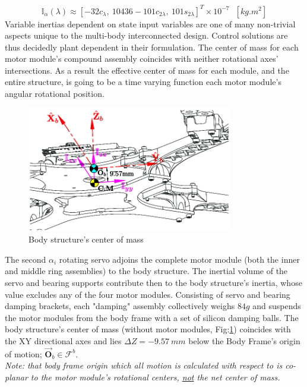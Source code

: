 \begin{equation}\label{eq:inertia.middle.vpa}
\mathbb{I}_\alpha(\lambda)\approx[-32{c}_{\lambda},~ 10436-101{c}_{2\lambda},~ 101{s}_{2\lambda}]^T\times10^{-7}~~~[kg.m^2]
\end{equation}
Variable inertias dependent on state input variables are one of many non-trivial aspects unique to the multi-body interconnected design. Control solutions are thus decidedly plant dependent in their formulation. The center of mass for each motor module's compound assembly coincides with neither rotational axes' intersections. As a result the effective center of mass for each module, and the entire structure, is going to be a time varying function each motor module's angular rotational position.
\begin{figure}[hbtp]
\centering
\includegraphics[width=0.8\textwidth]{figs/inertia-center}
\caption{Body structure's center of mass}
\label{fig:inertia-center}
\vspace{15pt}
\end{figure}
\par
The second $\alpha_i$ rotating servo adjoins the complete motor module (both the inner and middle ring assemblies) to the body structure. The inertial volume of the servo and bearing supports contribute then to the body structure's inertia, whose value excludes any of the four motor modules. Consisting of servo and bearing damping brackets, each "damping" assembly collectively weighs $84g$ and suspends the motor modules from the body frame with a set of silicon damping balls. The body structure's center of mass (without motor modules, Fig:\ref{fig:inertia-center}) coincides with the XY directional axes and lies $\Delta Z=-9.57~mm$ below the Body Frame's origin of motion; $\vec{\mathbf{O}}_b\in\mathcal{F}^b$.
\\
\emph{\color{Gray}Note: that body frame origin which all motion is calculated with respect to is co-planar to the motor module's rotational centers, \underline{not} the net center of mass.}
